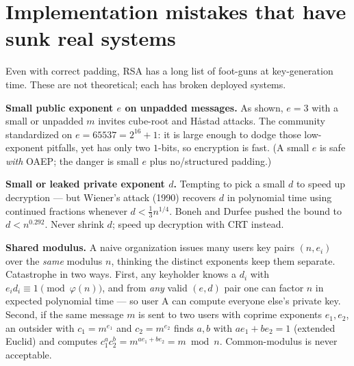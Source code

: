\section{Implementation mistakes that have sunk real systems}
\label{ch19:mistakes}

Even with correct padding, RSA has a long list of foot-guns at key-generation time. These are not theoretical; each has broken deployed systems.

\begin{attackbox}
\textbf{Small public exponent $e$ on unpadded messages.} As shown, $e=3$ with a small or unpadded $m$ invites cube-root and H\r{a}stad attacks. The community standardized on $e=65537=2^{16}+1$: it is large enough to dodge those low-exponent pitfalls, yet has only two $1$-bits, so encryption is fast. (A small $e$ is safe \emph{with} OAEP; the danger is small $e$ plus no/structured padding.)
\end{attackbox}

\begin{attackbox}
\textbf{Small or leaked private exponent $d$.} Tempting to pick a small $d$ to speed up decryption --- but Wiener's attack (1990) recovers $d$ in polynomial time using continued fractions whenever $d < \tfrac13 n^{1/4}$. Boneh and Durfee pushed the bound to $d < n^{0.292}$. Never shrink $d$; speed up decryption with CRT instead.
\end{attackbox}

\begin{attackbox}
\textbf{Shared modulus.} A naive organization issues many users key pairs $(n, e_i)$ over the \emph{same} modulus $n$, thinking the distinct exponents keep them separate. Catastrophe in two ways. First, any keyholder knows a $d_i$ with $e_i d_i\equiv 1\pmod{\varphi(n)}$, and from \emph{any} valid $(e,d)$ pair one can factor $n$ in expected polynomial time --- so user A can compute everyone else's private key. Second, if the same message $m$ is sent to two users with coprime exponents $e_1, e_2$, an outsider with $c_1=m^{e_1}$ and $c_2=m^{e_2}$ finds $a,b$ with $ae_1+be_2=1$ (extended Euclid) and computes $c_1^{a}c_2^{b} = m^{ae_1+be_2}=m\bmod n$. Common-modulus is never acceptable.
\end{attackbox}

